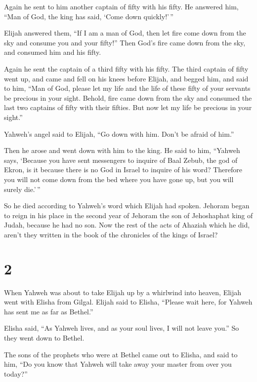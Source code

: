  Again he sent to him another captain of fifty with his
fifty. He answered him, ``Man of God, the king has said, `Come down
quickly!'\,''

 Elijah answered them, ``If I am a man of God, then let
fire come down from the sky and consume you and your fifty!'' Then God's
fire came down from the sky, and consumed him and his fifty.

 Again he sent the captain of a third fifty with his fifty.
The third captain of fifty went up, and came and fell on his knees
before Elijah, and begged him, and said to him, ``Man of God, please let
my life and the life of these fifty of your servants be precious in your
sight.  Behold, fire came down from the sky and consumed
the last two captains of fifty with their fifties. But now let my life
be precious in your sight.''

 Yahweh's angel said to Elijah, ``Go down with him. Don't
be afraid of him.''

Then he arose and went down with him to the king.  He said
to him, ``Yahweh says, `Because you have sent messengers to inquire of
Baal Zebub, the god of Ekron, is it because there is no God in Israel to
inquire of his word? Therefore you will not come down from the bed where
you have gone up, but you will surely die.'\,''

 So he died according to Yahweh's word which Elijah had
spoken. Jehoram began to reign in his place in the second year of
Jehoram the son of Jehoshaphat king of Judah, because he had no son.
 Now the rest of the acts of Ahaziah which he did, aren't
they written in the book of the chronicles of the kings of Israel?

\hypertarget{section-1}{%
\section{2}\label{section-1}}

 When Yahweh was about to take Elijah up by a whirlwind into
heaven, Elijah went with Elisha from Gilgal.  Elijah said to
Elisha, ``Please wait here, for Yahweh has sent me as far as Bethel.''

Elisha said, ``As Yahweh lives, and as your soul lives, I will not leave
you.'' So they went down to Bethel.

 The sons of the prophets who were at Bethel came out to
Elisha, and said to him, ``Do you know that Yahweh will take away your
master from over you today?''

